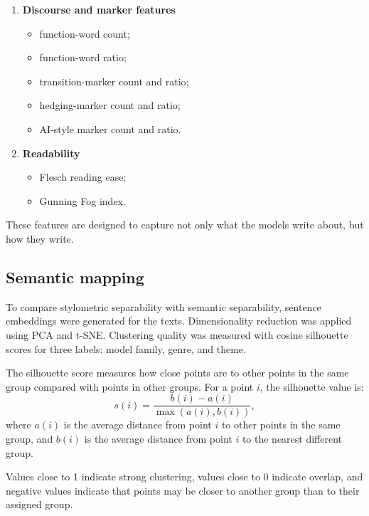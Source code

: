 \begin{enumerate}
\begin{itemize}
    \item hapax legomena ratio;
    \item repeated word ratio;
    \item Yule's K;
    \item Simpson diversity;
    \item Honore's R;
    \item moving-average type-token ratio.
  \end{itemize}
  \item \textbf{Discourse and marker features}
  \begin{itemize}
    \item function-word count;
    \item function-word ratio;
    \item transition-marker count and ratio;
    \item hedging-marker count and ratio;
    \item AI-style marker count and ratio.
  \end{itemize}
  \item \textbf{Readability}
  \begin{itemize}
    \item Flesch reading ease;
    \item Gunning Fog index.
  \end{itemize}
\end{enumerate}

These features are designed to capture not only what the models write about, but how they write.

\subsection{Semantic mapping}
To compare stylometric separability with semantic separability, sentence embeddings were generated for the texts. Dimensionality reduction was applied using PCA and t-SNE. Clustering quality was measured with cosine silhouette scores for three labels: model family, genre, and theme.

The silhouette score measures how close points are to other points in the same group compared with points in other groups. For a point $i$, the silhouette value is:
\[
 s(i) = \frac{b(i)-a(i)}{\max(a(i), b(i))},
\]
where $a(i)$ is the average distance from point $i$ to other points in the same group, and $b(i)$ is the average distance from point $i$ to the nearest different group.

Values close to 1 indicate strong clustering, values close to 0 indicate overlap, and negative values indicate that points may be closer to another group than to their assigned group.

